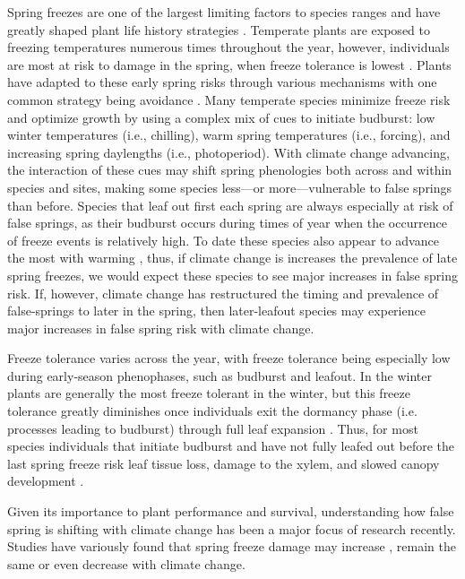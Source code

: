 \documentclass{article}\usepackage[]{graphicx}\usepackage[]{color}
\begin{document}
Spring freezes are one of the largest limiting factors to species ranges and have greatly shaped plant life history strategies \citep{Kollas2014}. Temperate plants are exposed to freezing temperatures numerous times throughout the year, however, individuals are most at risk to damage in the spring, when freeze tolerance is lowest \citep{Sakai1987}. Plants have adapted to these early spring risks through various mechanisms with one common strategy being avoidance \citep{Vitasse2014}. Many temperate species minimize freeze risk and optimize growth by using a complex mix of cues to initiate budburst: low winter temperatures (i.e., chilling), warm spring temperatures (i.e., forcing), and increasing spring daylengths (i.e., photoperiod). With climate change advancing, the interaction of these cues may shift spring phenologies both across and within species and sites, making some species less---or more---vulnerable to false springs than before. Species that leaf out first each spring are always especially at risk of false springs, as their budburst occurs during times of year when the occurrence of freeze events is relatively high. To date these species also appear to advance the most with warming  \citep{Wolkovich2012}, thus, if climate change is increases the prevalence of late spring freezes, we would expect these species to see major increases in false spring risk. If, however, climate change has restructured the timing and prevalence of false-springs to later in the spring, then later-leafout species may experience major increases in false spring risk with climate change. 
 
Freeze tolerance varies across the year, with freeze tolerance being especially low during early-season phenophases, such as budburst and leafout. In the winter plants are generally the most freeze tolerant in the winter, but this freeze tolerance greatly diminishes once individuals exit the dormancy phase (i.e. processes leading to budburst) through full leaf expansion \citep{Lenz2016, Vitasse2014}. Thus, for most species individuals that initiate budburst and have not fully leafed out before the last spring freeze risk leaf tissue loss, damage to the xylem, and slowed canopy development \citep{Gu2008, Hufkens2012}.

Given its importance to plant performance and survival, understanding how false spring is shifting with climate change has been a major focus of research recently. Studies have variously found that spring freeze damage may increase \citep{Augspurger2013, Hannenin1991, Labe2016}, remain the same \citep{Scheifinger2003} or even decrease \citep{Kramer1994, Vitra2017} with climate change. 
\end{document}
